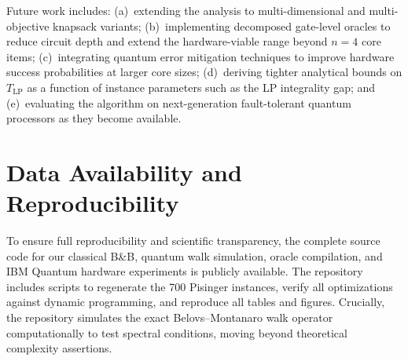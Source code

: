 \documentclass[conference]{IEEEtran} \IEEEoverridecommandlockouts
\begin{document}
Future work includes: (a)~extending the analysis to multi-dimensional and multi-objective knapsack variants; (b)~implementing decomposed gate-level oracles to reduce circuit depth and extend the hardware-viable range beyond $n = 4$ core items; (c)~integrating quantum error mitigation techniques to improve hardware success probabilities at larger core sizes; (d)~deriving tighter analytical bounds on $T_{\text{LP}}$ as a function of instance parameters such as the LP integrality gap; and (e)~evaluating the algorithm on next-generation fault-tolerant quantum processors as they become available.




\section{Data Availability and Reproducibility}

To ensure full reproducibility and scientific transparency, the complete source code for our classical B\&B, quantum walk simulation, oracle compilation, and IBM Quantum hardware experiments is publicly available. The repository includes scripts to regenerate the 700 Pisinger instances, verify all optimizations against dynamic programming, and reproduce all tables and figures. Crucially, the repository simulates the exact Belovs--Montanaro walk operator computationally to test spectral conditions, moving beyond theoretical complexity assertions.










 
\end{document}
